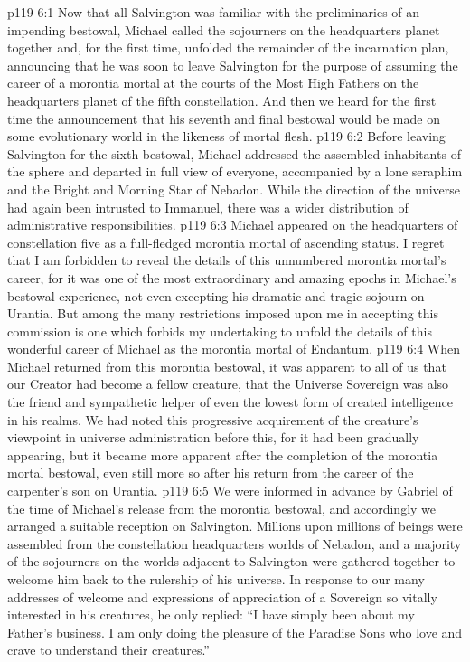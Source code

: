 \vs p119 6:1 Now that all Salvington was familiar with the preliminaries of an impending bestowal, Michael called the sojourners on the headquarters planet together and, for the first time, unfolded the remainder of the incarnation plan, announcing that he was soon to leave Salvington for the purpose of assuming the career of a morontia mortal at the courts of the Most High Fathers on the headquarters planet of the fifth constellation. And then we heard for the first time the announcement that his seventh and final bestowal would be made on some evolutionary world in the likeness of mortal flesh.
\vs p119 6:2 Before leaving Salvington for the sixth bestowal, Michael addressed the assembled inhabitants of the sphere and departed in full view of everyone, accompanied by a lone seraphim and the Bright and Morning Star of Nebadon. While the direction of the universe had again been intrusted to Immanuel, there was a wider distribution of administrative responsibilities.
\vs p119 6:3 Michael appeared on the headquarters of constellation five as a full\hyp{}fledged morontia mortal of ascending status. I regret that I am forbidden to reveal the details of this unnumbered morontia mortal’s career, for it was one of the most extraordinary and amazing epochs in Michael’s bestowal experience, not even excepting his dramatic and tragic sojourn on Urantia. But among the many restrictions imposed upon me in accepting this commission is one which forbids my undertaking to unfold the details of this wonderful career of Michael as the morontia mortal of Endantum.
\vs p119 6:4 When Michael returned from this morontia bestowal, it was apparent to all of us that our Creator had become a fellow creature, that the Universe Sovereign was also the friend and sympathetic helper of even the lowest form of created intelligence in his realms. We had noted this progressive acquirement of the creature’s viewpoint in universe administration before this, for it had been gradually appearing, but it became more apparent after the completion of the morontia mortal bestowal, even still more so after his return from the career of the carpenter’s son on Urantia.
\vs p119 6:5 We were informed in advance by Gabriel of the time of Michael’s release from the morontia bestowal, and accordingly we arranged a suitable reception on Salvington. Millions upon millions of beings were assembled from the constellation headquarters worlds of Nebadon, and a majority of the sojourners on the worlds adjacent to Salvington were gathered together to welcome him back to the rulership of his universe. In response to our many addresses of welcome and expressions of appreciation of a Sovereign so vitally interested in his creatures, he only replied: “I have simply been about my Father’s business. I am only doing the pleasure of the Paradise Sons who love and crave to understand their creatures.”\plusone
